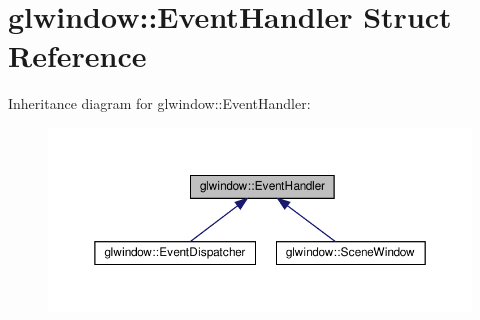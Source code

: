 \hypertarget{structglwindow_1_1_event_handler}{}\section{glwindow\+:\+:Event\+Handler Struct Reference}
\label{structglwindow_1_1_event_handler}


Inheritance diagram for glwindow\+:\+:Event\+Handler\+:
\nopagebreak
\begin{figure}[H]
\begin{center}
\leavevmode
\includegraphics[width=350pt]{structglwindow_1_1_event_handler__inherit__graph}
\end{center}
\end{figure}

